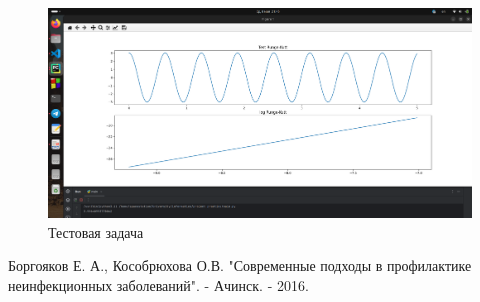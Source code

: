 \documentclass[a4paper,12pt]{article}
\begin{document}
	\begin{figure}[ht!]
		  \begin{center}
		  \includegraphics[scale=0.2]{sources/test.png}
		  \end{center}
		  \vspace*{-8mm}
		  \caption{Тестовая задача}\label{fig:test}
	\end{figure}

	\newpage
	
	\begin{thebibliography}{w:40}
		
		 Боргояков Е. А., Кособрюхова О.В. "Современные подходы в профилактике неинфекционных заболеваний". - Ачинск. - 2016.
		
	\end{thebibliography}
	
	
\end{document}
